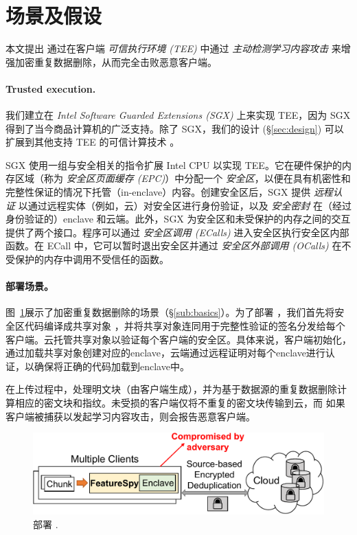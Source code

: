 \section{场景及假设}
\label{sec:setting}
本文提出 \sysnameF 通过在客户端 {\em 可信执行环境 (TEE)} 中通过 {\em 主动检测学习内容攻击} 来增强加密重复数据删除，从而完全击败恶意客户端。

\paragraph{Trusted execution.} 我们建立在 {\em Intel Software Guarded Extensions (SGX)} \cite{sgx} 上来实现 TEE，因为 SGX 得到了当今商品计算机的广泛支持。除了 SGX，我们的设计 (\S\ref{sec:design}) 可以扩展到其他支持 TEE 的可信计算技术 \cite{amd-sev, pinto19}。

SGX 使用一组与安全相关的指令扩展 Intel CPU 以实现 TEE。它在硬件保护的内存区域（称为 {\em 安全区页面缓存 (EPC)}）中分配一个 {\em 安全区}，以便在具有机密性和完整性保证的情况下托管（in-enclave）内容。创建安全区后，SGX 提供 {\em 远程认证} 以通过远程实体（例如，云）对安全区进行身份验证，以及 {\em 安全密封} 在（经过身份验证的）enclave 和云端。此外，SGX 为安全区和未受保护的内存之间的交互提供了两个接口。程序可以通过 {\em 安全区调用 (ECalls)} 进入安全区执行安全区内部函数。在 ECall 中，它可以暂时退出安全区并通过 {\em 安全区外部调用 (OCalls)} 在不受保护的内存中调用不受信任的函数。



\paragraph{部署场景。}图~\ref{fig:model}展示了加密重复数据删除的场景（\S\ref{sub:basics}）。为了部署 \sysnameF，我们首先将安全区代码编译成共享对象 \cite{sgx}，并将共享对象连同用于完整性验证的签名分发给每个客户端。云托管共享对象以验证每个客户端的安全区。具体来说，客户端初始化\sysnameF，通过加载共享对象创建对应的enclave，云端通过远程证明\cite{sgx}对每个enclave进行认证，以确保将正确的代码加载到enclave中。

在上传过程中，\sysnameF 处理明文块（由客户端生成），并为基于数据源的重复数据删除计算相应的密文块和指纹。未受损的客户端仅将不重复的密文块传输到云，而 \sysnameF 如果客户端被捕获以发起学习内容攻击，则会报告恶意客户端。

\begin{figure}
  \centering
  \includegraphics[width=\textwidth]{pic/featurespy/deployment.pdf}
  \vspace{-6pt}
  \caption{部署 \sysnameF.}
  \label{fig:model}
  \vspace{-6pt}
\end{figure}

